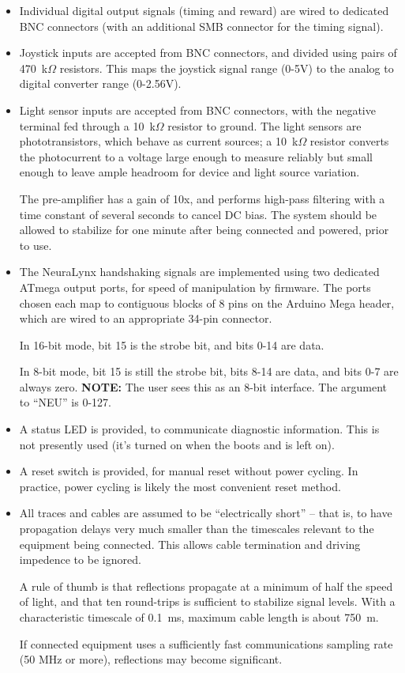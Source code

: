 \begin{itemize}
\item Individual digital output signals (timing and reward) are wired to 
dedicated BNC connectors (with an additional SMB connector for the timing 
signal).

\item Joystick inputs are accepted from BNC connectors, and divided using 
pairs of 470~k$\Omega$ resistors. This maps the joystick signal range 
(0-5V) to the analog to digital converter range (0-2.56V).

\item Light sensor inputs are accepted from BNC connectors, with the 
negative terminal fed through a 10~k$\Omega$ resistor to ground. The light 
sensors are phototransistors, which behave as current sources; a 
10~k$\Omega$ resistor converts the photocurrent to a voltage large enough 
to measure reliably but small enough to leave ample headroom for device 
and light source variation.

The pre-amplifier has a gain of 10x, and performs high-pass filtering with
a time constant of several seconds to cancel DC bias. The system should be
allowed to stabilize for one minute after being connected and powered,
prior to use.

\item The NeuraLynx handshaking signals are implemented using two 
dedicated ATmega output ports, for speed of manipulation by firmware. 
The ports chosen each map to contiguous blocks of 8 pins on the Arduino 
Mega header, which are wired to an appropriate 34-pin connector.

In 16-bit mode, bit 15 is the strobe bit, and bits 0-14 are data.

In 8-bit mode, bit 15 is still the strobe bit, bits 8-14 are data, and 
bits 0-7 are always zero. \textbf{NOTE:} The user sees this as an 8-bit 
interface. The argument to ``NEU'' is 0-127.

\item A status LED is provided, to communicate diagnostic information. 
This is not presently used (it's turned on when the {\projectname} boots 
and is left on).

\item A reset switch is provided, for manual reset without power cycling. 
In practice, power cycling is likely the most convenient reset method.

\item All traces and cables are assumed to be ``electrically short'' -- 
that is, to have propagation delays very much smaller than the timescales 
relevant to the equipment being connected. This allows cable termination 
and driving impedence to be ignored.

A rule of thumb is that reflections propagate at a minimum of half the 
speed of light, and that ten round-trips is sufficient to stabilize signal 
levels. With a characteristic timescale of 0.1~ms, maximum cable length is 
about 750~m.

If connected equipment uses a sufficiently fast communications sampling
rate (50 MHz or more), reflections may become significant.
\end{itemize}

